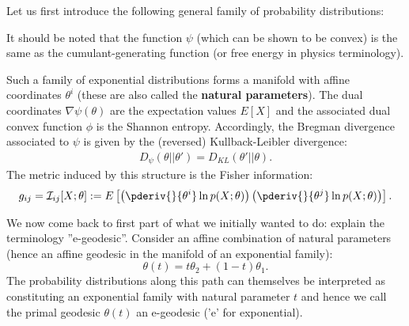     Let us first introduce the following general family of probability distributions:
    \begin{remark}
        It should be noted that the function $\psi$ (which can be shown to be convex) is the same as the cumulant-generating function (or free energy in physics terminology).
    \end{remark}

    Such a family of exponential distributions forms a manifold with affine coordinates $\theta^i$ (these are also called the \textbf{natural parameters}). The dual coordinates $\nabla\psi(\theta)$ are the expectation values $E[X]$ and the associated dual convex function $\phi$ is the Shannon entropy. Accordingly, the Bregman divergence associated to $\psi$ is given by the (reversed) Kullback-Leibler divergence:
    \begin{gather}
        \label{info:KL_reversal}
        D_\psi(\theta||\theta') = D_{KL}(\theta'||\theta).
    \end{gather}
    The metric induced by this structure is the Fisher information:
    \begin{gather}
        g_{ij} = \mathcal{I}_{ij}[X;\theta] := E\left[\left(\pderiv{}{\theta^i}\ln p(X;\theta)\right)\left(\pderiv{}{\theta^j}\ln p(X;\theta)\right)\right].
    \end{gather}

    We now come back to first part of what we initially wanted to do: explain the terminology ''e-geodesic''. Consider an affine combination of natural parameters (hence an affine geodesic in the manifold of an exponential family): \[\theta(t) = t\theta_2 + (1-t)\theta_1.\] The probability distributions along this path can themselves be interpreted as constituting an exponential family with natural parameter $t$ and hence we call the primal geodesic $\theta(t)$ an e-geodesic ('e' for exponential).

